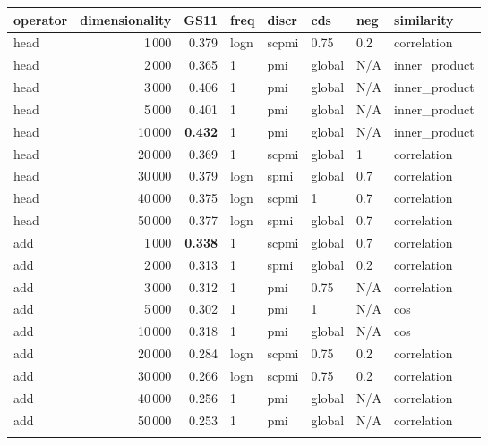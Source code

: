 \begin{tabular}{lrrlllll}
\toprule
operator &  dimensionality &   GS11 &  freq &  discr &     cds &  neg &     similarity \\
\midrule
    head &            1\,000 &  0.379 &  logn &  scpmi &    0.75 &  0.2 &    correlation \\
    head &            2\,000 &  0.365 &     1 &    pmi &  global &  N/A &  inner\_product \\
    head &            3\,000 &  0.406 &     1 &    pmi &  global &  N/A &  inner\_product \\
    head &            5\,000 &  0.401 &     1 &    pmi &  global &  N/A &  inner\_product \\
    head &           10\,000 &  \textbf{0.432} &     1 &    pmi &  global &  N/A &  inner\_product \\
    head &           20\,000 &  0.369 &     1 &  scpmi &  global &    1 &    correlation \\
    head &           30\,000 &  0.379 &  logn &   spmi &  global &  0.7 &    correlation \\
    head &           40\,000 &  0.375 &  logn &  scpmi &       1 &  0.7 &    correlation \\
    head &           50\,000 &  0.377 &  logn &   spmi &  global &  0.7 &    correlation \\ \addlinespace
     add &            1\,000 &  \textbf{0.338} &     1 &  scpmi &  global &  0.7 &    correlation \\
     add &            2\,000 &  0.313 &     1 &   spmi &  global &  0.2 &    correlation \\
     add &            3\,000 &  0.312 &     1 &    pmi &    0.75 &  N/A &    correlation \\
     add &            5\,000 &  0.302 &     1 &    pmi &       1 &  N/A &            cos \\
     add &           10\,000 &  0.318 &     1 &    pmi &  global &  N/A &            cos \\
     add &           20\,000 &  0.284 &  logn &  scpmi &    0.75 &  0.2 &    correlation \\
     add &           30\,000 &  0.266 &  logn &  scpmi &    0.75 &  0.2 &    correlation \\
     add &           40\,000 &  0.256 &     1 &    pmi &  global &  N/A &    correlation \\
     add &           50\,000 &  0.253 &     1 &    pmi &  global &  N/A &    correlation \\ \addlinespace

\end{tabular}
